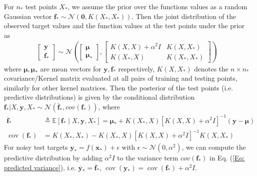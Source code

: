 For $n_\ast$ test points $X_\ast$, we assume the prior over the functions values as a random Gaussian vector $\mathbf{f}_\ast \sim \mathcal{N}(\mathbf{0}, K(X_\ast, X_\ast))$.
Then the joint distribution of the observed target values and the function values at the test points under the prior as 
\begin{align}
    \left[\begin{array}{l}\mathbf{y} \\ \mathbf{f}_{*}\end{array}\right] \sim \mathcal{N}\left(
        \left[\begin{array}{cc}
        \bm{\mu}  \\
        \bm{\mu}_\ast
        \end{array}\right],
    \left[\begin{array}{cc}K(X, X)+\alpha^{2} I & K\left(X, X_{*}\right) \\ K\left(X_{*}, X\right) & K\left(X_{*}, X_{*}\right)\end{array}\right]\right)
\end{align}
where
$\bm{\mu}, \bm{\mu}_\ast$ are mean vectors for $\mathbf{y}, \mathbf{f}_{*}$ respectively,
$K(X, X_\ast)$ denotes the $n \times n_\ast$ covariance/Kernel matrix evaluated at all pairs of training and testing points, similarly for other kernel matrices.
Then the posterior of the test points (i.e. predictive distributions) is given by the conditional distribution $\mathbf{f}_\ast | X, \mathbf{y}, X_\ast \sim \mathcal{N}(\bar{\mathbf{f}}_\ast, cov(\mathbf{f}_\ast))$, where
\begin{align}
   \overline{\mathbf{f}}_{*} & \triangleq \mathbb{E}\left[\mathbf{f}_{*} \mid X, \mathbf{y}, X_{*}\right]=
   \bm{\mu}_\ast + K\left(X_{*}, X\right)\left[K(X, X)+\alpha^{2} I\right]^{-1} (\mathbf{y} - \bm{\mu})\\
   \label{Eq: predicted variance}
   \operatorname{cov}\left(\mathbf{f}_{*}\right) &=K\left(X_{*}, X_{*}\right)-K\left(X_{*}, X\right)\left[K(X, X)+\alpha^{2} I\right]^{-1} K\left(X, X_{*}\right) 
\end{align}
For noisy test targets $\mathbf{y}_\ast = f(\mathbf{x}_\ast) + \epsilon$ with $\epsilon \sim \mathcal{N}(0, \alpha^2)$, we can compute the predictive distribution by adding $\alpha^2 I$ to the variance term $cov(\mathbf{f}_\ast)$ in Eq. (\ref{Eq: predicted variance}),
i.e. $\overline{\mathbf{y}}_{*} = \overline{\mathbf{f}}_{*}$, $\operatorname{cov}\left(\mathbf{y}_{*}\right) = \operatorname{cov}\left(\mathbf{f}_{*}\right) + \alpha^2 I$.


